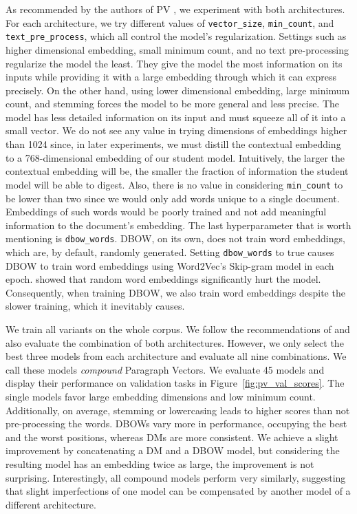As recommended by the authors of PV \citep{le2014distributed}, we experiment
with both architectures. For each architecture, we try different values of
\texttt{vector\_size}, \texttt{min\_count}, and \texttt{text\_pre\_process},
which all control the model's regularization. Settings such as higher
dimensional embedding, small minimum count, and no text pre-processing
regularize the model the least. They give the model the most information on its
inputs while providing it with a large embedding through which it
can express precisely. On the other hand, using lower dimensional embedding,
large minimum count, and stemming forces the model to be
more general and less precise. The model has less detailed information on its
input and must squeeze all of it into a small vector. We do not see any value in
trying dimensions of embeddings higher than 1024 since, in later experiments, we
must distill the contextual embedding to a 768-dimensional embedding of our
student model. Intuitively, the larger the contextual embedding will be,
the smaller the fraction of information the student model will be able
to digest. Also, there is no value in considering \texttt{min\_count} to be
lower than two since we would only add words unique to a single
document. Embeddings of such words would be poorly trained and not add
meaningful information to the document's embedding. The last hyperparameter that is
worth mentioning is \texttt{dbow\_words}. DBOW, on its own, does not train word
embeddings, which are, by default, randomly generated. Setting \texttt{dbow\_words} to true
causes DBOW to train word embeddings using Word2Vec's Skip-gram model
\citep{mikolov2013efficient} in each epoch. \cite{lau2016empirical} showed that
random word embeddings significantly hurt the model. Consequently, when
training DBOW, we also train word embeddings despite the slower training, which
it inevitably causes.


We train all variants on the whole  corpus. We follow the
recommendations of \cite{le2014distributed} and also evaluate the combination
of both architectures. However, we only select the best three models from each
architecture and evaluate all nine combinations. We call these models
\emph{compound} Paragraph Vectors. We evaluate 45 models and display their
performance on validation tasks in Figure~\ref{fig:pv_val_scores}.
The single models favor large embedding dimensions and low minimum count.
Additionally, on average, stemming or lowercasing leads to higher scores than
not pre-processing the words. DBOWs vary more in performance, occupying the
best and the worst positions, whereas DMs are more consistent. We achieve a
slight improvement by concatenating a DM and a DBOW model, but considering the
resulting model has an embedding twice as large, the improvement is not
surprising. Interestingly, all compound models perform very similarly,
suggesting that slight imperfections of one model can be compensated by another
model of a different architecture.

